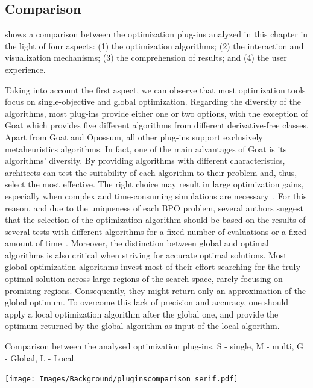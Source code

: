 	
	\subsection{Comparison}
	
	 shows a comparison between the optimization plug-ins analyzed in this chapter in the light of four aspects: (1) the optimization algorithms; (2) the interaction and visualization mechanisms; (3) the comprehension of results; and (4) the user experience.
		
	Taking into account the first aspect, we can observe that most optimization tools focus on single-objective and global optimization. Regarding the diversity of the algorithms, most plug-ins provide either one or two options, with the exception of Goat which provides five different algorithms from different derivative-free classes. Apart from Goat and Opossum, all other plug-ins support exclusively metaheuristics algorithms. In fact, one of the main advantages of Goat is its algorithms' diversity. By providing algorithms with different characteristics, architects can test the suitability of each algorithm to their problem and, thus, select the most effective. The right choice may result in large optimization gains, especially when complex and time-consuming simulations are necessary~\cite{Wortmann2016BBO}. For this reason, and due to the uniqueness of each \ac{BPO} problem, several authors suggest that the selection of the optimization algorithm should be based on the results of several tests with different algorithms for a fixed number of evaluations or a fixed amount of time~\cite{Hamdy2016,Wortmann2016BBO}. Moreover, the distinction between global and optimal algorithms is also critical when striving for accurate optimal solutions. Most global optimization algorithms invest most of their effort searching for the truly optimal solution across large regions of the search space, rarely focusing on promising regions. Consequently, they might return only an approximation of the global optimum. To overcome this lack of precision and accuracy, one should apply a local optimization algorithm after the global one, and provide the optimum returned by the global algorithm as input of the local algorithm.
	
	\begin{table}[h]	
		\centering
		\caption[Comparison between the analysed optimization plug-ins]{Comparison between the analysed optimization plug-ins. S - single, M - multi, G - Global, L - Local.}
		
		\texttt{[image: Images/Background/pluginscomparison\_serif.pdf]}
		\label{table:pluginscompare}	
	\end{table}
	
